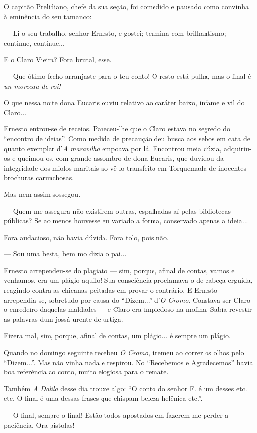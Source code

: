 O capitão Prelidiano, chefe da sua seção, foi comedido e pausado como
convinha à eminência do seu tamanco:

--- Li o seu trabalho, senhor Ernesto, e gostei; termina com
brilhantismo; continue, continue...

E o Claro Vieira? Fora brutal, esse.

--- Que ótimo fecho arranjaste para o teu conto! O resto está pulha, mas
o final é \emph{un morceau de roi!}

O que nessa noite dona Eucaris ouviu relativo ao caráter baixo, infame e
vil do Claro...

Ernesto entrou-se de receios. Pareceu-lhe que o Claro estava no segredo
do ``encontro de ideias''. Como medida de precaução deu busca aos sebos
em cata de quanto exemplar d'\emph{A maravilha} empoava por lá.
Encontrou meia dúzia, adquiriu-os e queimou-os, com grande assombro de
dona Eucaris, que duvidou da integridade dos miolos maritais ao vê-lo
transfeito em Torquemada de inocentes brochuras carunchosas.

Mas nem assim sossegou.

--- Quem me assegura não existirem outras, espalhadas aí pelas
bibliotecas públicas? Se ao menos houvesse eu variado a forma,
conservado apenas a ideia...

Fora audacioso, não havia dúvida. Fora tolo, pois não.

--- Sou uma besta, bem mo dizia o pai...

Ernesto arrependeu-se do plagiato --- sim, porque, afinal de contas,
vamos e venhamos, era um plágio aquilo! Sua consciência proclamava-o de
cabeça erguida, reagindo contra as chicanas peitadas em provar o
contrário. E Ernesto arrependia-se, sobretudo por causa do ``Dizem...''
d'\emph{O Cromo}. Constava ser Claro o enredeiro daquelas maldades --- e
Claro era impiedoso na mofina. Sabia revestir as palavras dum jossá
urente de urtiga.

Fizera mal, sim, porque, afinal de contas, um plágio... é sempre um
plágio.

Quando no domingo seguinte recebeu \emph{O Cromo}, tremeu ao correr os
olhos pelo ``Dizem...''. Mas não vinha nada e respirou. No ``Recebemos e
Agradecemos'' havia boa referência ao conto, muito elogiosa para o
remate.

Também \emph{A Dalila} desse dia trouxe algo: ``O conto do senhor F. é
um desses etc. etc. O final é uma dessas frases que chispam beleza
helênica etc.''.

--- O final, sempre o final! Estão todos apostados em fazerem-me perder
a paciência. Ora pistolas!

